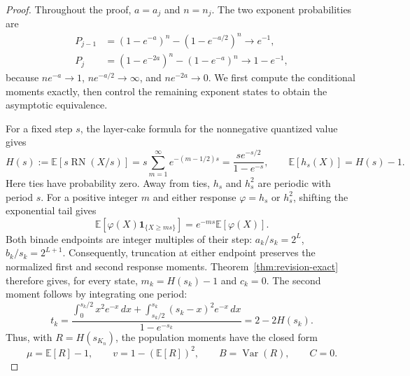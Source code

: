 \begin{proof}
Throughout the proof, $a=a_j$ and $n=n_j$. The two exponent probabilities
are
\begin{align*}
 P_{j-1}&=(1-e^{-a})^n-(1-e^{-a/2})^n\longrightarrow e^{-1},\\
 P_j&=(1-e^{-2a})^n-(1-e^{-a})^n\longrightarrow1-e^{-1},
\end{align*}
because $ne^{-a}\to1$, $ne^{-a/2}\to\infty$, and $ne^{-2a}\to0$.
We first compute the conditional moments exactly, then control the
remaining exponent states to obtain the asymptotic equivalence.

For a fixed step $s$, the layer-cake formula for the nonnegative quantized
value gives
\begin{equation}\label{eq:revision-exp-response}
 H(s):=\mathbb E[s\operatorname{RN}(X/s)]
 =s\sum_{m=1}^{\infty}e^{-(m-1/2)s}
 =\frac{s e^{-s/2}}{1-e^{-s}},\qquad \mathbb E[h_s(X)]=H(s)-1.
\end{equation}
Here ties have probability zero. Away from ties, $h_s$ and $h_s^2$ are
periodic with period $s$. For a positive integer $m$ and either response
$\varphi=h_s$ or $h_s^2$, shifting the exponential tail gives
\[
 \mathbb E[\varphi(X)\mathbf1_{\{X\ge ms\}}]
   =e^{-ms}\mathbb E[\varphi(X)].
\]
Both binade endpoints are integer multiples of their step:
$a_k/s_k=2^L$, $b_k/s_k=2^{L+1}$. Consequently, truncation at either
endpoint preserves the normalized first and second response moments.
Theorem~\ref{thm:revision-exact} therefore gives, for every state,
$m_k=H(s_k)-1$ and $c_k=0$.
The second moment follows by integrating one period:
\[
 t_k=\frac{\int_0^{s_k/2}x^2e^{-x}\,dx
                +\int_{s_k/2}^{s_k}(s_k-x)^2e^{-x}\,dx}{1-e^{-s_k}}
       =2-2H(s_k).
\]
Thus, with $R=H(s_{K_n})$, the population moments have the closed form
\begin{equation}\label{eq:revision-exp-closed}
 \mu=\mathbb E[R]-1,\qquad v=1-(\mathbb E[R])^2,\qquad
 B=\operatorname{Var}(R),\qquad C=0.
\end{equation}


\end{proof}
